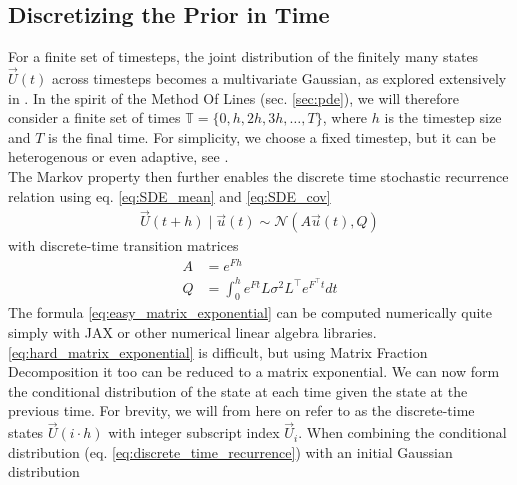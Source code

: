 \subsection*{Discretizing the Prior in Time}
For a finite set of timesteps, the joint distribution of the finitely many states $\vec{U}(t)$ across timesteps becomes a multivariate Gaussian, as explored extensively in \cite{gp_Rasmussen}. In the spirit of the Method Of Lines (sec. \ref{sec:pde}), we will therefore consider a finite set of times $\mathbb{T} = \{0, h, 2h, 3h, \dots, T\}$, where $h$ is the timestep size and $T$ is the final time. For simplicity, we choose a fixed timestep, but it can be heterogenous or even adaptive, see \cite{nicoThesis}. 
\\
The Markov property then further enables the discrete time stochastic recurrence relation \cite{probnum} using eq. \ref{eq:SDE_mean} and \ref{eq:SDE_cov}
\begin{align}\label{eq:discrete_time_recurrence}
    \vec{U}(t+h) \;|\; \vec{u}(t) \sim \mathcal{N}(A\vec{u}(t), Q)
\end{align}
with discrete-time transition matrices
\begin{align}
    A &= e^{Fh}\label{eq:easy_matrix_exponential}
    \\
    Q &= \int_0^h e^{Ft}L\sigma^2L^\top e^{F^\top t} dt \label{eq:hard_matrix_exponential}
\end{align}
The formula \ref{eq:easy_matrix_exponential} can be computed numerically quite simply with JAX \cite{jax} or other numerical linear algebra libraries. \ref{eq:hard_matrix_exponential} is difficult, but using Matrix Fraction Decomposition it too can be reduced to a matrix exponential.
We can now form the conditional distribution of the state at each time given the state at the previous time. For brevity, we will from here on refer to as the discrete-time states $\vec{U}(i\cdot h)$ with integer subscript index $\vec{U}_i$. When combining the conditional distribution (eq. \ref{eq:discrete_time_recurrence}) with an initial Gaussian distribution 
